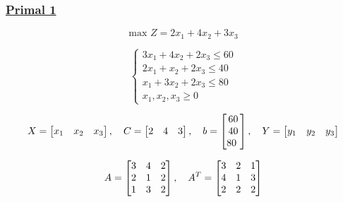 \vspace{0.25cm}
\subsubsection*{\underline{Primal 1}}

\vspace{0.25cm}
\[\text{max } Z = 2x_1 + 4x_2 + 3x_3\]

\[
\left\{
\begin{array}{l}
        3x_{1} + 4x_{2} + 2x_{3}\leq 60 \\[2pt]
        2x_{1} + x_{2} + 2x_{3}\leq 40 \\[2pt]
        x_{1} + 3x_{2} + 2x_{3} \leq 80 \\[2pt]
        x_{1}, x_{2}, x_{3}\geq 0
\end{array}
\right.
\]

\vspace{0.5cm}
\[
X = \left[\begin{matrix} x_1 & x_2 & x_3 \end{matrix}\right], \hspace{0.35cm}
C = \left[\begin{matrix} 2 & 4 & 3 \end{matrix}\right], \hspace{0.35cm}
b = \left[\begin{matrix} 60 \\ 40\\80 \ \end{matrix}\right], \hspace{0.35cm}
Y = \left[\begin{matrix} y_1 & y_2 & y_3 \end{matrix}\right]
\]

\vspace{0.5cm}

\[
A = \left[\begin{matrix}   3 & 4 & 2 \\
                           2 & 1 & 2\\
                           1 & 3 & 2
                           \end{matrix}\right], \hspace{0.35cm}
        A^{T} = \left[\begin{matrix}  3 & 2 & 1  \\
                                      4 & 1 & 3\\
                                      2 & 2 & 2
                     \end{matrix}\right]
\]

